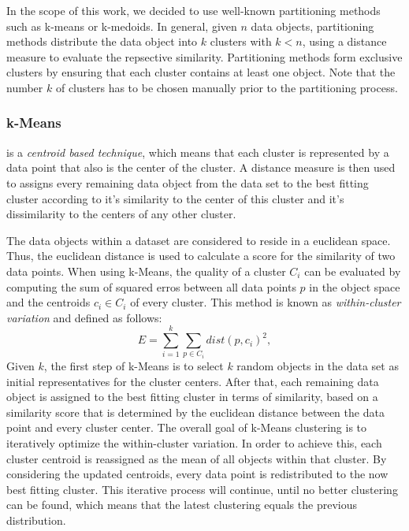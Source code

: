 \documentclass[runningheads]{llncs}
\begin{document}
	In the scope of this work, we decided to use well-known partitioning methods such as k-means or k-medoids. In general, given $n$ data objects, partitioning methods distribute the data object into $k$ clusters with $k<n$, using a distance measure to evaluate the repsective similarity. Partitioning methods form exclusive clusters by ensuring that each cluster contains at least one object. Note that the number $k$ of clusters has to be chosen manually prior to the partitioning process.
	
	\subsubsection{k-Means}
	
	is a \textit{centroid based technique}, which means that each cluster is represented by a data point that also is the center of the cluster. A distance measure is then used to assigns every remaining data object from the data set to the best fitting cluster according to it's similarity to the center of this cluster and it's dissimilarity to the centers of any other cluster.
	
	The data objects within a dataset are considered to reside in a euclidean space. Thus, the euclidean distance is used to calculate a score for the similarity of two data points. When using k-Means, the quality of a cluster $C_i$ can be evaluated by computing the sum of squared erros between all data points $p$ in the object space and the centroids $c_i \in C_i$ of every cluster. This method is known as \textit{within-cluster variation} \cite{data_mining} and defined as follows: 
	\begin{equation}
		E = \sum_{i=1}^{k} \sum_{p \in C_i} dist(p, c_i)^2,
	\end{equation}
	Given $k$, the first step of k-Means is to select $k$ random objects in the data set as initial representatives for the cluster centers. After that, each remaining data object is assigned to the best fitting cluster in terms of similarity, based on a similarity score that is determined by the euclidean distance between the data point and every cluster center. The overall goal of k-Means clustering is to iteratively optimize the within-cluster variation. In order to achieve this, each cluster centroid is reassigned as the mean of all objects within that cluster. By considering the updated centroids, every data point is redistributed to the now best fitting cluster. This iterative process will continue, until no better clustering can be found, which means that the latest clustering equals the previous distribution.
	
\end{document}
